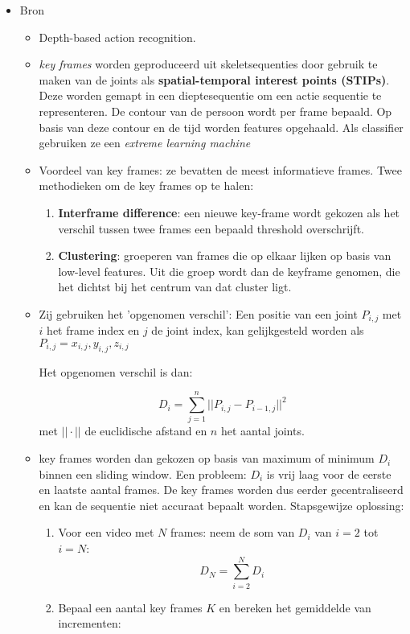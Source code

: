 \begin{itemize}
	\item Bron \cite{Suolan2017}
	\begin{itemize}
		\item Depth-based action recognition.
		\item \textit{key frames} worden geproduceerd uit skeletsequenties door gebruik te maken van de joints als \textbf{spatial-temporal interest points (STIPs)}. Deze worden gemapt in een dieptesequentie om een actie sequentie te representeren. De contour van de persoon wordt per frame bepaald. Op basis van deze contour en de tijd worden features opgehaald. Als classifier gebruiken ze een \textit{extreme learning machine}
		\item Voordeel van key frames: ze bevatten de meest informatieve frames. Twee methodieken om de key frames op te halen:
		\begin{enumerate}
			\item \textbf{Interframe difference}: een nieuwe key-frame wordt gekozen als het verschil tussen twee frames een bepaald threshold overschrijft.
			\item \textbf{Clustering}: groeperen van frames die op elkaar lijken op basis van low-level features. Uit die groep wordt dan de keyframe genomen, die het dichtst bij het centrum van dat cluster ligt.
		\end{enumerate}
		\item Zij gebruiken het 'opgenomen verschil': Een positie van een joint $P_{i,j}$ met $i$ het frame index en $j$ de joint index, kan gelijkgesteld worden als  $P_{i, j} = {x_{i, j}, y_{i, j}, z_{i, j}}$
		
		Het opgenomen verschil is dan:
		
		$$D_i = \sum_{j = 1}^{n} || P_{i, j} - P_{i - 1, j}||^2$$
		met $||\cdot||$ de euclidische afstand en $n$ het aantal joints.
		
		\item key frames worden dan gekozen op basis van maximum of minimum $D_i$ binnen een sliding window. Een probleem: $D_i$ is vrij laag voor de eerste en laatste aantal frames. De key frames worden dus eerder gecentraliseerd en kan de sequentie niet accuraat bepaalt worden. Stapsgewijze oplossing:
		\begin{enumerate}
			\item Voor een video met $N$ frames: neem de som van $D_i$ van $i = 2$ tot $i = N$:
			$$D_N = \sum_{i = 2}^{N}D_i$$
			\item Bepaal een aantal key frames $K$ en bereken het gemiddelde van incrementen:
			

\end{enumerate}
\end{itemize}
\end{itemize}
